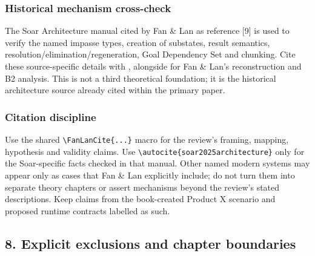 \subsubsection{Historical mechanism cross-check}\label{historical-mechanism-cross-check}

The Soar Architecture manual cited by Fan \& Lan as reference {[}9{]} is used to verify the named impasse types, creation of substates, result semantics, resolution/elimination/regeneration, Goal Dependency Set and chunking. Cite these source-specific details with \autocite{soar2025architecture}, alongside  for Fan \& Lan's reconstruction and B2 analysis. This is not a third theoretical foundation; it is the historical architecture source already cited within the primary paper.

\subsubsection{Citation discipline}\label{citation-discipline}

Use the shared \texttt{\textbackslash{}FanLanCite\{...\}} macro for the review's framing, mapping, hypothesis and validity claims. Use \texttt{\textbackslash{}autocite\{soar2025architecture\}} only for the Soar-specific facts checked in that manual. Other named modern systems may appear only as cases that Fan \& Lan explicitly include; do not turn them into separate theory chapters or assert mechanisms beyond the review's stated descriptions. Keep claims from the book-created Product X scenario and proposed runtime contracts labelled as such.

\subsection{8. Explicit exclusions and chapter boundaries}\label{explicit-exclusions-and-chapter-boundaries}


